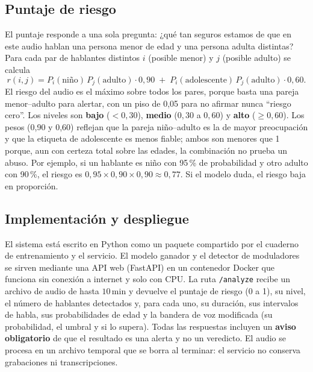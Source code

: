 \documentclass[11pt,a4paper]{article}
\begin{document}
\subsection{Puntaje de riesgo}
\label{sec:riesgo}

El puntaje responde a una sola pregunta: ¿qué tan seguros estamos de que en este audio hablan una persona menor de edad y una persona adulta distintas? Para cada par de hablantes distintos $i$ (posible menor) y $j$ (posible adulto) se calcula
\begin{equation}
r(i,j) = P_i(\text{niño})\,P_j(\text{adulto}) \cdot 0{,}90 \;+\; P_i(\text{adolescente})\,P_j(\text{adulto}) \cdot 0{,}60.
\end{equation}
El riesgo del audio es el máximo sobre todos los pares, porque basta una pareja menor--adulto para alertar, con un piso de 0,05 para no afirmar nunca ``riesgo cero''. Los niveles son \textbf{bajo} ($<0{,}30$), \textbf{medio} ($0{,}30$ a $0{,}60$) y \textbf{alto} ($\geq 0{,}60$). Los pesos (0,90 y 0,60) reflejan que la pareja niño--adulto es la de mayor preocupación y que la etiqueta de adolescente es menos fiable; ambos son menores que 1 porque, aun con certeza total sobre las edades, la combinación no prueba un abuso. Por ejemplo, si un hablante es niño con 95\,\% de probabilidad y otro adulto con 90\,\%, el riesgo es $0{,}95 \times 0{,}90 \times 0{,}90 \approx 0{,}77$. Si el modelo duda, el riesgo baja en proporción.

\subsection{Implementación y despliegue}

El sistema está escrito en Python como un paquete compartido por el cuaderno de entrenamiento y el servicio. El modelo ganador y el detector de moduladores se sirven mediante una API web (FastAPI) en un contenedor Docker que funciona sin conexión a internet y solo con CPU. La ruta \texttt{/analyze} recibe un archivo de audio de hasta $10\,\mathrm{min}$ y devuelve el puntaje de riesgo (0 a 1), su nivel, el número de hablantes detectados y, para cada uno, su duración, sus intervalos de habla, sus probabilidades de edad y la bandera de voz modificada (su probabilidad, el umbral y si lo supera). Todas las respuestas incluyen un \textbf{aviso obligatorio} de que el resultado es una alerta y no un veredicto. El audio se procesa en un archivo temporal que se borra al terminar: el servicio no conserva grabaciones ni transcripciones.
\end{document}
